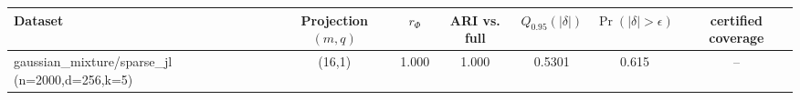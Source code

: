 \begin{tabular}{lcccccc}
\toprule
Dataset & Projection $(m,q)$ & $r_\Phi$ & ARI vs. full & $Q_{0.95}(|\delta|)$ & $\Pr(|\delta|>\epsilon)$ & certified coverage \\
\midrule
gaussian\_mixture/sparse\_jl (n=2000,d=256,k=5) & (16,1) & 1.000 & 1.000 & 0.5301 & 0.615 & -- \\
\bottomrule
\end{tabular}
